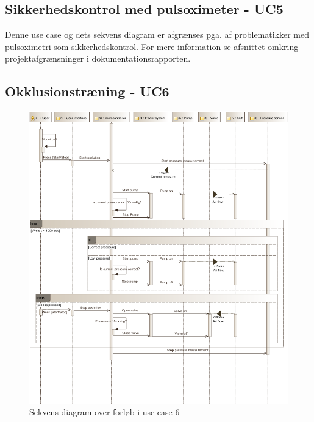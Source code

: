 \newpage

\subsection{Sikkerhedskontrol med pulsoximeter - UC5}
Denne use case og dets sekvens diagram er afgrænses pga. af problematikker med pulsoximetri som sikkerhedskontrol. For mere information se afsnittet omkring projektafgrænsninger i dokumentationsrapporten. 

\subsection{Okklusionstræning - UC6}
\begin{figure}[H]
	\includegraphics[width=\textwidth]{SystemArkitektur/pdfs/SD_UC6-crop.pdf}
\caption{Sekvens diagram over forløb i use case 6}
\end{figure}
\newpage

